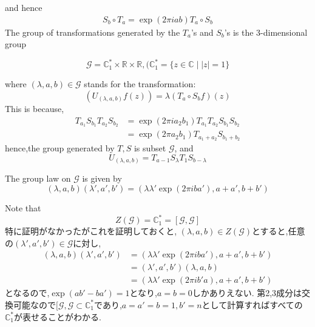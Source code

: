 \documentclass[uplatex,b5j,11pt]{jsbook}
\begin{document}
and hence
\begin{align}
S_b \circ T_a = \exp(2\pi i ab) T_a \circ S_b \tag{(*)}
\end{align}
The group of transformations generated by the $T_a$'s and $S_b$'s is the 3-dimensional group

\begin{equation*}
 \mathcal{G} = \mathbb{C}_1^{*} \times \mathbb{R} \times \mathbb{R}, (\mathbb{C}_1^* = \{z \in \mathbb{C} \mid |z| =1\}
\end{equation*}

where $(\lambda, a, b) \in \mathcal{G}$ stands for the transformation:
\begin{equation*}
 (U_{(\lambda, a, b)}f(z)) = \lambda (T_a \circ S_bf)(z)
\end{equation*}
This is because,
\begin{align*}
T_{a_1}S_{b_1}T_{a_2}S_{b_2} & = \exp(2\pi i a_2b_1) T_{a_1}T_{a_2}S_{b_1}S_{b_2} \\
                             & = \exp(2\pi a_2 b_1)T_{a_1+a_2}S_{b_1+b_2}
\end{align*}
hence,the group generated by $T,S$ is subset $\mathcal{G}$,
and
\begin{equation*}
U_{(\lambda, a,b)} = T_{a-1}S_{\lambda}T_1 S_{b- \lambda}
\end{equation*}

The group law on $\mathcal{G}$ is given by
\begin{equation*}
    (\lambda ,a ,b )(\lambda', a', b') = (\lambda \lambda' \exp(2\pi i ba'), a+a', b+b')
\end{equation*}

Note that
\begin{equation*}
    Z(\mathcal{G}) = \mathbb{C}_1^* =  [\mathcal{G}, \mathcal{G}]
\end{equation*}
特に証明がなかったがこれを証明しておくと,
$(\lambda, a, b) \in Z(\mathcal{G})$とすると,任意の$(\lambda', a', b') \in \mathcal{G}$に対し,
\begin{align*}
  (\lambda ,a ,b )(\lambda', a', b') & = (\lambda \lambda' \exp(2\pi i ba'), a+a', b+b') \\
                                     & =  (\lambda' ,a' ,b' )(\lambda, a, b) \\
                                     & = (\lambda \lambda' \exp(2\pi i b'a), a+a', b+b')
\end{align*}
となるので,$\exp(ab' - ba') =1$となり,$a =b =0$しかありえない.
第2,3成分は交換可能なので$[\mathcal{G}, \mathcal{G} \subset \mathbb{C}_1^*$であり,$a=a'=b=1,b'= n$として計算すればすべての$\mathbb{C}_1^*$が表せることがわかる.
\end{document}
